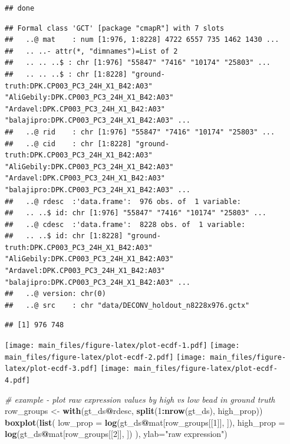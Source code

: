 \documentclass[]{article}
\newenvironment{Shaded}{\begin{snugshade}}{\end{snugshade}}
\newcommand{\CommentTok}[1]{\textcolor[rgb]{0.56,0.35,0.01}{\textit{#1}}}
\newcommand{\DataTypeTok}[1]{\textcolor[rgb]{0.13,0.29,0.53}{#1}}
\newcommand{\DecValTok}[1]{\textcolor[rgb]{0.00,0.00,0.81}{#1}}
\newcommand{\KeywordTok}[1]{\textcolor[rgb]{0.13,0.29,0.53}{\textbf{#1}}}
\newcommand{\NormalTok}[1]{#1}
\newcommand{\OperatorTok}[1]{\textcolor[rgb]{0.81,0.36,0.00}{\textbf{#1}}}
\newcommand{\StringTok}[1]{\textcolor[rgb]{0.31,0.60,0.02}{#1}}
\begin{document}
\begin{verbatim}
## done
\end{verbatim}

\begin{verbatim}
## Formal class 'GCT' [package "cmapR"] with 7 slots
##   ..@ mat    : num [1:976, 1:8228] 4722 6557 735 1462 1430 ...
##   .. ..- attr(*, "dimnames")=List of 2
##   .. .. ..$ : chr [1:976] "55847" "7416" "10174" "25803" ...
##   .. .. ..$ : chr [1:8228] "ground-truth:DPK.CP003_PC3_24H_X1_B42:A03" "AliGebily:DPK.CP003_PC3_24H_X1_B42:A03" "Ardavel:DPK.CP003_PC3_24H_X1_B42:A03" "balajipro:DPK.CP003_PC3_24H_X1_B42:A03" ...
##   ..@ rid    : chr [1:976] "55847" "7416" "10174" "25803" ...
##   ..@ cid    : chr [1:8228] "ground-truth:DPK.CP003_PC3_24H_X1_B42:A03" "AliGebily:DPK.CP003_PC3_24H_X1_B42:A03" "Ardavel:DPK.CP003_PC3_24H_X1_B42:A03" "balajipro:DPK.CP003_PC3_24H_X1_B42:A03" ...
##   ..@ rdesc  :'data.frame':  976 obs. of  1 variable:
##   .. ..$ id: chr [1:976] "55847" "7416" "10174" "25803" ...
##   ..@ cdesc  :'data.frame':  8228 obs. of  1 variable:
##   .. ..$ id: chr [1:8228] "ground-truth:DPK.CP003_PC3_24H_X1_B42:A03" "AliGebily:DPK.CP003_PC3_24H_X1_B42:A03" "Ardavel:DPK.CP003_PC3_24H_X1_B42:A03" "balajipro:DPK.CP003_PC3_24H_X1_B42:A03" ...
##   ..@ version: chr(0) 
##   ..@ src    : chr "data/DECONV_holdout_n8228x976.gctx"
\end{verbatim}

\begin{verbatim}
## [1] 976 748
\end{verbatim}

\texttt{[image: main\_files/figure-latex/plot-ecdf-1.pdf]}
\texttt{[image: main\_files/figure-latex/plot-ecdf-2.pdf]}
\texttt{[image: main\_files/figure-latex/plot-ecdf-3.pdf]}
\texttt{[image: main\_files/figure-latex/plot-ecdf-4.pdf]}

\begin{Shaded}
\begin{Highlighting}[]
\CommentTok{# example - plot raw expression values by high vs low bead in ground truth}
\NormalTok{row_groups <-}\StringTok{ }\KeywordTok{with}\NormalTok{(gt_ds}\OperatorTok{@}\NormalTok{rdesc, }\KeywordTok{split}\NormalTok{(}\DecValTok{1}\OperatorTok{:}\KeywordTok{nrow}\NormalTok{(gt_ds), high_prop))}
\KeywordTok{boxplot}\NormalTok{(}\KeywordTok{list}\NormalTok{(}
  \DataTypeTok{low_prop =} \KeywordTok{log}\NormalTok{(gt_ds}\OperatorTok{@}\NormalTok{mat[row_groups[[}\DecValTok{1}\NormalTok{]], ]),}
  \DataTypeTok{high_prop =} \KeywordTok{log}\NormalTok{(gt_ds}\OperatorTok{@}\NormalTok{mat[row_groups[[}\DecValTok{2}\NormalTok{]], ])}
\NormalTok{), }\DataTypeTok{ylab=}\StringTok{"raw expression"}\NormalTok{)}
\end{Highlighting}
\end{Shaded}
\end{document}
